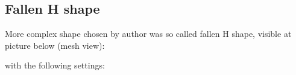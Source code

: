 \documentclass[onecolumn]{article}
\begin{document}
\newpage

\subsection{Fallen H shape}
More complex shape chosen by author was so called fallen H shape, visible at picture below (mesh view):

\noindent{}

with the following settings:
\end{document}

